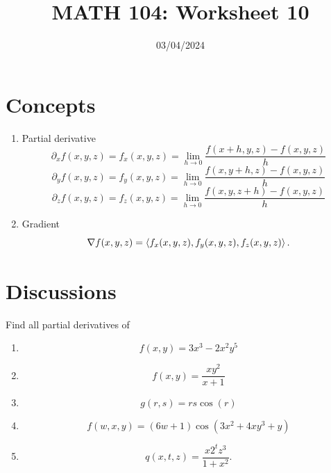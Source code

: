 \documentclass[12pt]{amsart}
\title{ MATH 104: Worksheet 10}
\author{}
\date{03/04/2024}
\begin{document}
\maketitle


\section{Concepts}

\begin{enumerate}
	\item Partial derivative
	      \begin{equation*}
		      \partial_x f (x,y,z) = f_x (x,y,z) =
		      \lim_{h\to 0} \frac{ f(x+h, y,z) - f(x,y,z) }{h}
	      \end{equation*}
	      \begin{equation*}
		      \partial_y f (x,y,z) = f_y (x,y,z) =
		      \lim_{h\to 0} \frac{ f(x, y+h,z) - f(x,y,z) }{h}
	      \end{equation*}
	      \begin{equation*}
		      \partial_z f (x,y,z) = f_z (x,y,z) =
		      \lim_{h\to 0} \frac{ f(x, y, z+ h) - f(x,y, z) }{h}
	      \end{equation*}
	\item Gradient
	      \begin{equation*}
		      \nabla f(x,y,z) = \langle f_x (x,y,z), f_y (x,y,z), f_z  (x,y,z)\rangle \,.
	      \end{equation*}
\end{enumerate}


\section{Discussions}

\begin{question}
	Find all partial derivatives of
	\begin{enumerate}
		\item  $$ f(x,y) = 3x^3 - 2x^2y^5$$
		      \vspace{7cm}
		\item  $$ f(x,y) = \frac{xy^2}{x+1} $$
		      \vspace{7cm}
		\item  \[ g(r,s) = rs \cos(r) \]
		      \vspace{7cm}
		\item  \[ f(w,x,y) = (6w+1) \cos(3x^2 + 4xy^3 + y) \]
		      \vspace{7cm}
		\item
		      \[
			      q(x,t,z) = \frac{x 2^t z^3}{1 + x^2}.
		      \]
		      \vspace{7cm}
	\end{enumerate}
\end{question}
\end{document}
